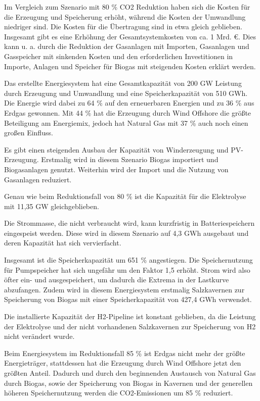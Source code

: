 Im Vergleich zum Szenario mit 80 \% CO2 Reduktion haben sich die Kosten für die Erzeugung und Speicherung erhöht, während die Kosten der Umwandlung niedriger sind. Die Kosten für die Übertragung sind in etwa gleich geblieben. 
Insgesamt gibt es eine Erhöhung der Gesamtsystemkosten von ca. 1 Mrd. €. Dies kann u. a. durch die Reduktion der Gasanlagen mit Importen, Gasanlagen und Gasspeicher mit sinkenden Kosten und den erforderlichen Investitionen in Importe, Anlagen und Speicher für Biogas mit steigenden Kosten erklärt werden.

Das erstellte Energiesystem hat eine Gesamtkapazität von 200 GW Leistung durch Erzeugung und Umwandlung und eine Speicherkapazität von 510 GWh. Die Energie wird dabei zu 64 \% auf den erneuerbaren Energien und zu 36 \% aus Erdgas gewonnen. Mit 44 \% hat die Erzeugung durch Wind Offshore die größte Beteiligung am Energiemix, jedoch hat Natural Gas mit 37 \% auch noch einen großen Einfluss.

Es gibt einen steigenden Ausbau der Kapazität von Winderzeugung und PV-Erzeugung. Erstmalig wird in diesem Szenario Biogas importiert und Biogasanlagen genutzt. Weiterhin wird der Import und die Nutzung von Gasanlagen reduziert.

Genau wie beim Reduktionsfall von 80 \% ist die Kapazität für die Elektrolyse mit 11,35 GW gleichgeblieben.

Die Strommasse, die nicht verbraucht wird, kann kurzfristig in Batteriespeichern eingespeist werden. Diese wird in diesem Szenario auf 4,3 GWh ausgebaut und deren Kapazität hat sich vervierfacht.

Insgesamt ist die Speicherkapazität um 651 \% angestiegen. Die Speichernutzung für Pumpspeicher hat sich ungefähr um den Faktor 1,5 erhöht. Strom wird also öfter ein- und ausgespeichert, um dadurch die Extrema in der Lastkurve abzufangen. Zudem wird in diesem Energiesystem erstmalig Salzkavernen zur Speicherung von Biogas mit einer Speicherkapazität von 427,4 GWh verwendet.

Die installierte Kapazität der H2-Pipeline ist konstant geblieben, da die Leistung der Elektrolyse und der nicht vorhandenen Salzkavernen zur Speicherung von H2 nicht verändert wurde.

Beim Energiesystem im Reduktionsfall 85 \% ist Erdgas nicht mehr der größte Energieträger, stattdessen hat die Erzeugung durch Wind Offshore jetzt den größten Anteil.
Dadurch und durch den beginnenden Austausch von Natural Gas durch Biogas, sowie der Speicherung von Biogas in Kavernen und der generellen höheren Speichernutzung werden die CO2-Emissionen um 85 \% reduziert.

